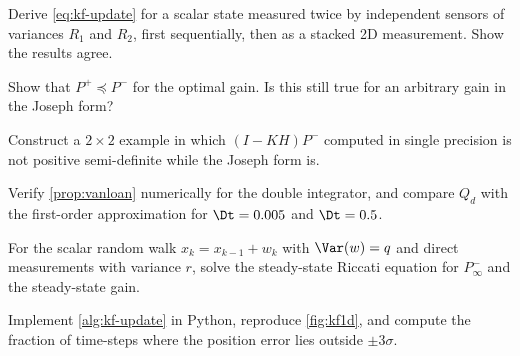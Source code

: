 \begin{exercises}
  \item Derive \eqref{eq:kf-update} for a scalar state measured twice by independent sensors of variances
        $R_1$ and $R_2$, first sequentially, then as a stacked 2D measurement. Show the results agree.
  \item Show that $P^+ \preceq P^-$ for the optimal gain. Is this still true for an arbitrary gain in the Joseph
        form?
  \item Construct a $2\times2$ example in which $(I - KH)P^-$ computed in single precision is not positive
        semi-definite while the Joseph form is.
  \item Verify \cref{prop:vanloan} numerically for the double integrator, and compare $Q_d$ with the first-order
        approximation for $\Dt = 0.005$ and $\Dt = 0.5$.
  \item For the scalar random walk $x_k = x_{k-1} + w_k$ with $\Var(w) = q$ and direct measurements with
        variance $r$, solve the steady-state Riccati equation for $P^-_\infty$ and the steady-state gain.
  \item Implement \cref{alg:kf-update} in Python, reproduce \cref{fig:kf1d}, and compute the fraction of
        time-steps where the position error lies outside $\pm3\sigma$.
\end{exercises}
